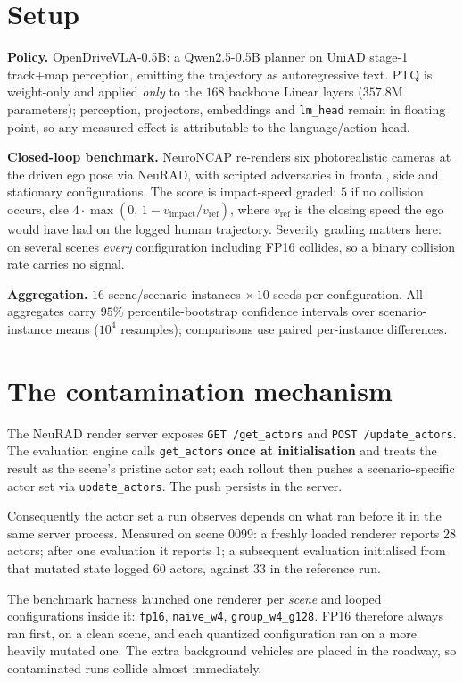 \documentclass[conference]{IEEEtran}
\begin{document}
\section{Setup}
\textbf{Policy.} OpenDriveVLA-0.5B: a Qwen2.5-0.5B planner on UniAD stage-1 track+map perception,
emitting the trajectory as autoregressive text. PTQ is weight-only and applied \emph{only} to the
$168$ backbone Linear layers ($357.8$M parameters); perception, projectors, embeddings and
\texttt{lm\_head} remain in floating point, so any measured effect is attributable to the
language/action head.

\textbf{Closed-loop benchmark.} NeuroNCAP re-renders six photorealistic cameras at the driven ego
pose via NeuRAD, with scripted adversaries in frontal, side and stationary configurations. The
score is impact-speed graded: $5$ if no collision occurs, else
$4\cdot\max(0,\,1-v_\text{impact}/v_\text{ref})$, where $v_\text{ref}$ is the closing speed the ego
would have had on the logged human trajectory. Severity grading matters here: on several scenes
\emph{every} configuration including FP16 collides, so a binary collision rate carries no signal.

\textbf{Aggregation.} $16$ scene/scenario instances $\times\,10$ seeds per configuration. All
aggregates carry $95\%$ percentile-bootstrap confidence intervals over scenario-instance means
($10^4$ resamples); comparisons use paired per-instance differences.

\section{The contamination mechanism}
\label{sec:mech}
The NeuRAD render server exposes \texttt{GET /get\_actors} and \texttt{POST /update\_actors}. The
evaluation engine calls \texttt{get\_actors} \textbf{once at initialisation} and treats the result
as the scene's pristine actor set; each rollout then pushes a scenario-specific actor set via
\texttt{update\_actors}. The push persists in the server.

Consequently the actor set a run observes depends on what ran before it in the same server
process. Measured on scene 0099: a freshly loaded renderer reports $28$ actors; after one
evaluation it reports $1$; a subsequent evaluation initialised from that mutated state logged
$60$ actors, against $33$ in the reference run.

The benchmark harness launched one renderer per \emph{scene} and looped configurations inside it:
\texttt{fp16}, \texttt{naive\_w4}, \texttt{group\_w4\_g128}. FP16 therefore always ran first, on a
clean scene, and each quantized configuration ran on a more heavily mutated one. The extra
background vehicles are placed in the roadway, so contaminated runs collide almost immediately.
\end{document}
